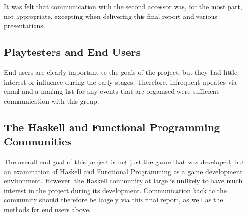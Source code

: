 It was felt that communication with the second accessor was, for the most part, not
appropriate, excepting when delivering this final report and various presentations.

\subsection{Playtesters and End Users}

End users are clearly important to the goals of the project, but they had little
interest or influence during the early stages. Therefore, infrequent updates via email
and a mailing list for any events that are organised were sufficient communication with
this group.

\subsection{The Haskell and Functional Programming Communities}

The overall end goal of this project is not just the game that was developed, but an examination
of Haskell and Functional Programming as a game development environment. However, the Haskell community at
large is unlikely to have much interest in the project during its development. Communication
back to the community should therefore be largely via this final report, as well as the
methods for end users above.
